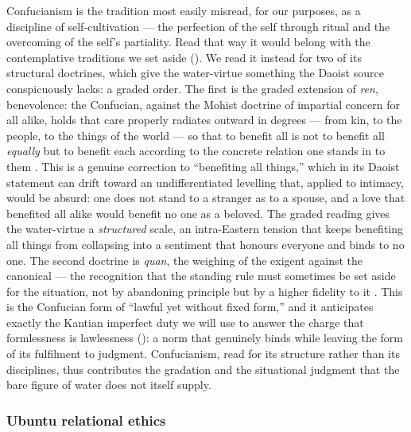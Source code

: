 Confucianism is the tradition most easily misread, for our purposes, as a discipline of self-cultivation --- the perfection of the self through ritual and the overcoming of the self's partiality. Read that way it would belong with the contemplative traditions we set aside (). We read it instead for two of its structural doctrines, which give the water-virtue something the Daoist source conspicuously lacks: a graded order. The first is the graded extension of \emph{ren}, benevolence: the Confucian, against the Mohist doctrine of impartial concern for all alike, holds that care properly radiates outward in degrees --- from kin, to the people, to the things of the world --- so that to benefit all is not to benefit all \emph{equally} but to benefit each according to the concrete relation one stands in to them \parencite{confucius1998,mencius2003}. This is a genuine correction to ``benefiting all things,'' which in its Daoist statement can drift toward an undifferentiated levelling that, applied to intimacy, would be absurd: one does not stand to a stranger as to a spouse, and a love that benefited all alike would benefit no one as a beloved. The graded reading gives the water-virtue a \emph{structured} scale, an intra-Eastern tension that keeps benefiting all things from collapsing into a sentiment that honours everyone and binds to no one. The second doctrine is \emph{quan}, the weighing of the exigent against the canonical --- the recognition that the standing rule must sometimes be set aside for the situation, not by abandoning principle but by a higher fidelity to it \parencite{tu1985}. This is the Confucian form of ``lawful yet without fixed form,'' and it anticipates exactly the Kantian imperfect duty we will use to answer the charge that formlessness is lawlessness (): a norm that genuinely binds while leaving the form of its fulfilment to judgment. Confucianism, read for its structure rather than its disciplines, thus contributes the gradation and the situational judgment that the bare figure of water does not itself supply.

\subsubsection{Ubuntu relational ethics}
\label{p20:ssub:review-ubuntu}


